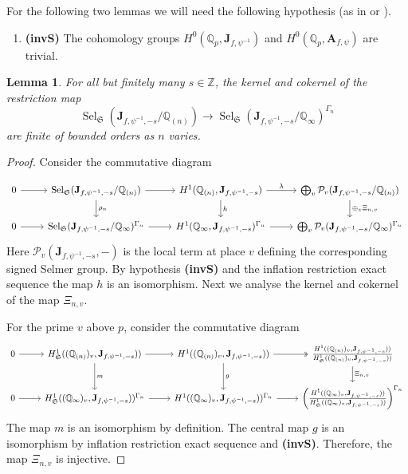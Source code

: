 \documentclass{amsart}
\newcommand{\Q}{\mathbb{Q}}
\newcommand{\Z}{\mathbb{Z}}
\newcommand{\fS}{\mathfrak{S}}
\newcommand{\bJ}{\mathbf{J}}
\newcommand{\bA}{\mathbf{A}}
\newcommand{\Sel}{\operatorname{Sel}}
\newtheorem{auxiliary proposition}[theorem]{Auxiliary Proposition}
\newtheorem{lemma}[theorem]{Lemma}
\newtheorem{main conjecture}[theorem]{Main Conjecture}
\newtheorem{main theorem}[theorem]{Main Theorem}
\newtheorem{modesty proposition}[theorem]{Modesty Proposition}
\newtheorem{open problem}[theorem]{Open Problem}
\newtheorem{convergence lemma}[theorem]{Convergence Lemma}
\newtheorem{corrected lemma}[theorem]{Corrected Lemma}
\newtheorem{growth lemma}[theorem]{Growth Lemma}
\newtheorem{coefficient lemma}[theorem]{Integrality Lemma}
\newtheorem{interpolation lemma}[theorem]{Interpolation Lemma}
\newtheorem{kernel lemma}[theorem]{Kernel Lemma}
\newtheorem{limit lemma}[theorem]{Limit Lemma}
\newtheorem{tandem lemma}[theorem]{Modesty Lemma}
\newtheorem{zero-finding lemma}[theorem]{Zero-Finding Lemma}
\begin{document}
For the following two lemmas we will need the following hypothesis (as in \cite[Section 1.2]{ponsinet} or \cite[last line in p. 1265]{HatleyLei19}).

\begin{enumerate}[~] 
    \item \textbf{(invS)} The cohomology groups  $H^0(\Q_p,\bJ_{f,\psi^{-1}})$ and $H^0(\Q_p,\bA_{f,\psi})$ are trivial.
\end{enumerate}
\begin{lemma}\label{lem1}
    For all but finitely many $s \in \Z$, the kernel and cokernel of the restriction map 
    $$\Sel_{\fS}(\bJ_{f,\psi^{-1},-s}/\Q_{(n)} )\rightarrow \Sel_{\fS}(\bJ_{f,\psi^{-1},-s}/\Q_\infty)^{\Gamma_n}$$ are finite of bounded orders as $n$ varies.
\end{lemma}
\begin{proof}
    Consider the commutative diagram 
    
	\begin{equation}\label{Selmer_definition}
	\begin{tikzcd}
	0 \arrow[r] & \Sel_{\fS}(\bJ_{f,\psi^{-1},-s}/\Q_{(n)} ) \arrow[d, "\rho_{{n}}"] \arrow[r] &  H^1(\Q_{(n)}, \bJ_{f,\psi^{-1},-s}) \arrow[d, "h"]  \arrow[r, "\lambda"] & \bigoplus_{v}\mathcal{P}_{v}(\bJ_{f,\psi^{-1},-s}/\Q_{(n)} ) \arrow[d, "\oplus_v\Xi_{{n,v}}"] \\
		0 \arrow[r] & \Sel_{\fS}(\bJ_{f,\psi^{-1},-s}/\Q_\infty)^{\Gamma_n} \arrow[r] & H^1(\Q_{\infty}, \bJ_{f,\psi^{-1},-s})^{\Gamma_n}  \arrow[r] & \bigoplus_{v}\mathcal{P}_{v}(\bJ_{f,\psi^{-1},-s}/\Q_{\infty})^{\Gamma_n}
	\end{tikzcd}
	\end{equation}
Here $\mathcal{P}_v(\bJ_{f,\psi^{-1},-s},-)$ is the local term at place $v$ defining the corresponding signed Selmer group. By hypothesis \textbf{(invS)} and the inflation restriction exact sequence the map $h$ is an isomorphism. Next we analyse the kernel and cokernel of the map $\Xi_{n,v}$. 

For the prime $v$ above $p$, consider the commutative diagram 
\begin{equation}\label{local}
	\begin{tikzcd}
	0 \arrow[r] & H^1_{\fS}((\Q_{(n)})_v, \bJ_{f,\psi^{-1},-s})) \arrow[d, "m"] \arrow[r] &  H^1((\Q_{(n)})_v,\bJ_{f,\psi^{-1},-s})) \arrow[d, "g"]  \arrow[r, twoheadrightarrow] & \frac{H^1((\Q_{(n)})_v, \bJ_{f,\psi^{-1},-s}))}{H^1_{\fS}((\Q_{(n)})_v, \bJ_{f,\psi^{-1},-s}))} \arrow[d, "\Xi_{n,v}"] \\
		0 \arrow[r] & H^1_{\fS}((\Q_\infty)_v, \bJ_{f,\psi^{-1},-s}))^{\Gamma_n} \arrow[r] &  H^1((\Q_\infty)_v, \bJ_{f, \psi^{-1},- s}))^{\Gamma_n}\arrow[r] & \left(\frac{H^1((\Q_\infty)_v, \bJ_{f,\psi^{-1},-s}))}{H^1_{\fS}((\Q_\infty)_v,\bJ_{f,\psi^{-1},-s}))}  \right)^{\Gamma_n}
	\end{tikzcd}
	\end{equation}
 The map $m$ is an isomorphism by definition. The central map $g$ is an isomorphism by inflation restriction exact sequence and \textbf{(invS)}. Therefore, the map $\Xi_{n,v}$ is injective. 
 

\end{proof}
\end{document}
